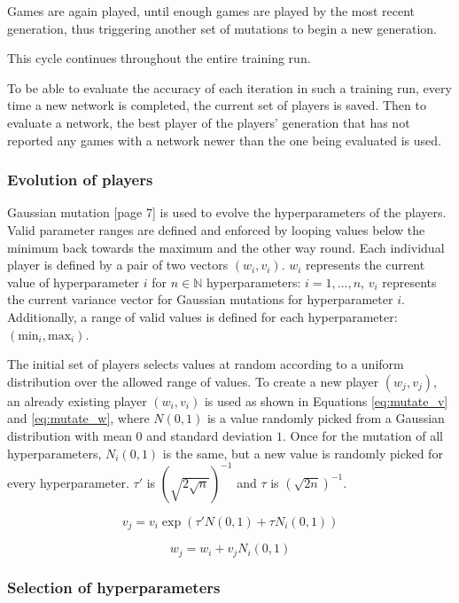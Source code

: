 \documentclass[12pt,onecolumn,oneside,titlepage]{article}
\begin{document}
Games are again played, until enough games are played by the most recent generation, thus triggering another set of mutations to begin a new generation.

This cycle continues throughout the entire training run.

To be able to evaluate the accuracy of each iteration in such a training run, every time a new network is completed, the current set of players is saved. 
Then to evaluate a network, the best player of the players' generation that has not reported any games with a network newer than the one being evaluated is used.

\subsubsection{Evolution of players}

Gaussian mutation \cite{yao1999evolving}[page 7] is used to evolve the hyperparameters of the players.
Valid parameter ranges are defined and enforced by looping values below the minimum back towards the maximum and the other way round.
Each individual player is defined by a pair of two vectors $(w_i, v_i)$. $w_i$ represents the current value of hyperparameter $i$ for 
$n \in \mathbb{N}$ hyperparameters: $i = 1, ..., n$, $v_i$ represents the current variance vector for Gaussian mutations for hyperparameter $i$.
Additionally, a range of valid values is defined for each hyperparameter: $(\text{min}_i, \text{max}_i)$.

The initial set of players selects values at random according to a uniform distribution over the allowed range of values.
To create a new player $(w_j, v_j)$, an already existing player $(w_i, v_i)$ is used as shown in Equations \ref{eq:mutate_v} and \ref{eq:mutate_w}, where $N(0,1)$ is a 
value randomly picked from a Gaussian distribution with mean $0$ and standard deviation $1$.
Once for the mutation of all hyperparameters,
$N_i(0,1)$ is the same, but a new value is randomly picked for every hyperparameter. $\tau'$ is $(\sqrt{2\sqrt{n}})^{-1}$ and $\tau$ is $(\sqrt{2n})^{-1}$.

\begin{equation}
 v_j = v_i \exp (\tau'N(0,1) + \tau N_i(0, 1))\label{eq:mutate_v}
\end{equation}

\begin{equation}
 w_j = w_i + v_j N_i(0, 1)\label{eq:mutate_w}
\end{equation}

\subsubsection{Selection of hyperparameters}
\end{document}
